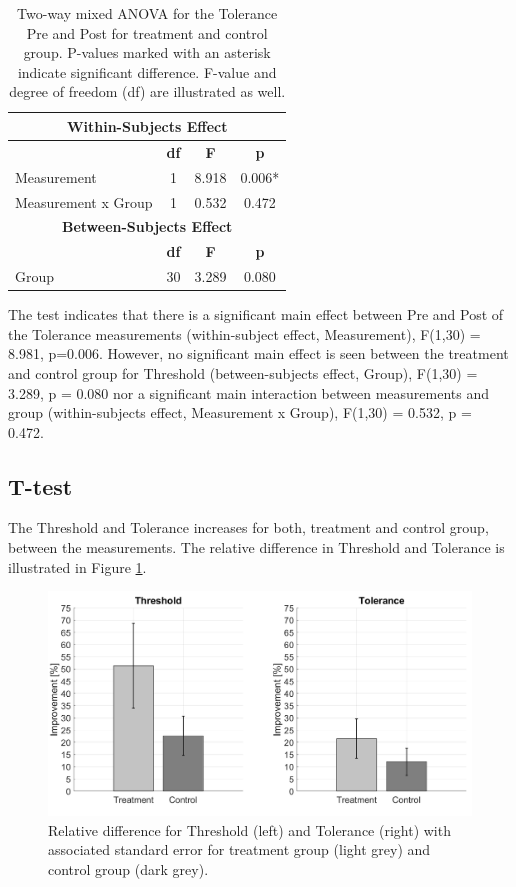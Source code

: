 \begin{table}[ht]
\caption{Two-way mixed ANOVA for the Tolerance Pre and Post for treatment and control group. P-values marked with an asterisk indicate significant difference. F-value and degree of
freedom (df) are illustrated as well.}
\centering
\begin{tabular}{l c c c}
\toprule
\multicolumn{4}{c}{\textbf{Within-Subjects Effect}} \\
\midrule  
& \textbf{df} & \textbf{F} & \textbf{p} \\ [0.5ex] %
Measurement & 1 &  8.918 &  0.006* \\
Measurement x Group & 1 & 0.532 & 0.472 \\
\toprule
\multicolumn{4}{c}{\textbf{Between-Subjects Effect}} \\
\midrule
 & \textbf{df} & \textbf{F} & \textbf{p} \\ [0.5ex] %
Group & 30 & 3.289 &  0.080 \\
\hline
\end{tabular}
\label{table:TWOWAYANOVA2}
\end{table}

\noindent
The test indicates that there is a significant main effect between Pre and Post of the Tolerance measurements (within-subject effect, Measurement), F(1,30) = 8.981, p=0.006. However, no significant main effect is seen between the treatment and control group for Threshold (between-subjects effect, Group), F(1,30) = 3.289, p = 0.080 nor a significant main interaction between  measurements and group (within-subjects effect, Measurement x Group), F(1,30) = 0.532, p = 0.472.

\subsection{T-test}
The Threshold and Tolerance increases for both, treatment and control group, between the measurements. The relative difference in Threshold and Tolerance is illustrated in Figure \ref{fig:barplot}. 

\begin{figure}[H]
\centering
\includegraphics[width=1\columnwidth]{../figures/barplot.png}
\caption{Relative difference for Threshold (left) and Tolerance (right) with associated standard error for treatment group (light grey) and control group (dark grey).}
\label{fig:barplot}
\end{figure} 

